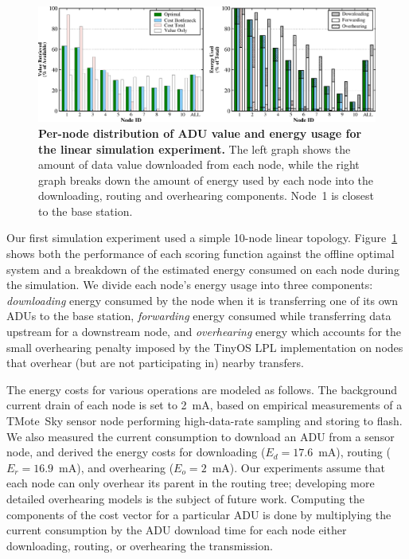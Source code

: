 \begin{figure}[t]
\begin{center}
\includegraphics[width=1.0\hsize]{./figs/Sensys2008/2008-lance-linearsimulation.eps}
\end{center}
\caption{{\bf Per-node distribution of ADU value and energy usage for the
linear simulation experiment.} 
The left graph shows the amount of data value downloaded from each node,
while the right graph breaks down the amount of energy used by each node into
the downloading, routing and overhearing components. Node~1 is closest to
the base station.}
\label{fig-lance-linearsimulation}
\end{figure}

Our first simulation experiment used a simple 10-node linear topology.
Figure~\ref{fig-lance-linearsimulation} shows both the performance of each
scoring function against the offline optimal system and a breakdown of the
estimated energy consumed on each node during the simulation. We divide each
node's energy usage into three components: \textit{downloading} energy
consumed by the node when it is transferring one of its own ADUs to the base
station, \textit{forwarding} energy consumed while transferring data upstream
for a downstream node, and \textit{overhearing} energy which accounts for the
small overhearing penalty imposed by the TinyOS LPL implementation on nodes
that overhear (but are not participating in) nearby transfers.

The energy costs for various operations are modeled as follows.  The
background current drain of each node is set to 2~mA, based on empirical
measurements of a TMote~Sky sensor node performing high-data-rate sampling and
storing to flash.  We also measured the current consumption to download an ADU
from a sensor node, and derived the energy costs for downloading ($E_d =
17.6$~mA), routing ($E_r = 16.9$~mA), and overhearing ($E_o = 2$~mA).
Our experiments assume that each node can only overhear its parent in the
routing tree; developing more detailed overhearing models is the subject of
future work.  Computing the components of the cost vector for a particular ADU
is done by multiplying the current consumption by the ADU download time for
each node either downloading, routing, or overhearing the transmission.

